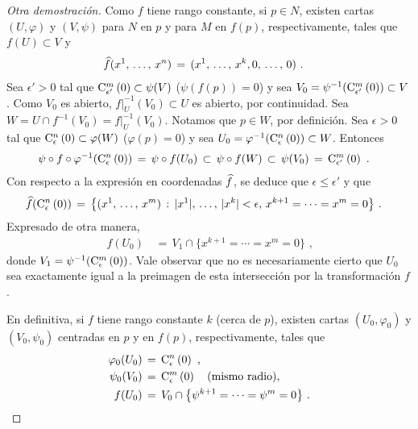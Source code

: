\begin{proof}[Otra demostraci\'{o}n]
	Como $f$ tiene rango constante, si $p\in N$, existen cartas
	$(U,\varphi)$ y $(V,\psi)$ para $N$ en $p$ y para $M$ en $f(p)$,
	respectivamente, tales que $f(U)\subset V$ y
	\begin{align*}
		\encoordenadas{f}(\lista*{x}{n}) & \,=\,
			(\lista*{x}{k},0,\,\dots,\,0)
		\text{ .}
	\end{align*}
	Sea $\epsilon'>0$ tal que $\cubo[m]{\epsilon'}{0}\subset\psi(V)$
	($\psi(f(p))=0$) y sea
	$V_0=\psi^{-1}(\cubo[m]{\epsilon'}{0})\subset V$. Como $V_0$ es
	abierto, $f|_U^{-1}(V_0)\subset U$ es abierto, por continuidad. Sea
	$W=U\cap f^{-1}(V_0)=f|_U^{-1}(V_0)$. Notamos que $p\in W$, por
	definici\'{o}n. Sea $\epsilon>0$ tal que
	$\cubo[n]{\epsilon}{0}\subset\varphi(W)$ ($\varphi(p)=0$) y sea
	$U_0=\varphi^{-1}(\cubo[n]{\epsilon}{0})\subset W$. Entonces
	\begin{align*}
		\psi\circ f\circ\varphi^{-1}(\cubo[n]{\epsilon}{0}) & \,=\,
			\psi\circ f(U_0) \,\subset\,\psi\circ f(W)\,\subset\,
			\psi(V_0)\,=\,\cubo[m]{\epsilon'}{0}
		\text{ .}
	\end{align*}
	Con respecto a la expresi\'{o}n en coordenadas $\encoordenadas{f}$, se
	deduce que $\epsilon\leq\epsilon'$ y que
	\begin{align*}
		\encoordenadas{f}(\cubo[n]{\epsilon}{0}) & \,=\,
			\big\{(\lista*{x}{m})\,:\,
				|x^1|,\,\dots,\,|x^k|<\epsilon,\,
				x^{k+1}=\cdots=x^m=0
				\big\}
		\text{ .}
	\end{align*}
	Expresado de otra manera,
	\begin{align*}
		f(U_0) & \,=\,V_1\cap \big\{x^{k+1}=\cdots=x^m=0\big\}
		\text{ ,}
	\end{align*}
	donde $V_1=\psi^{-1}(\cubo[m]{\epsilon}{0})$. Vale observar que no
	es necesariamente cierto que $U_0$ sea exactamente igual a la preimagen
	de esta intersecci\'{o}n por la transformaci\'{o}n $f$.

	En definitiva, si $f$ tiene rango constante $k$ (cerca de $p$), existen
	cartas $(U_0,\varphi_0)$ y $(V_0,\psi_0)$ centradas en $p$ y en $f(p)$,
	respectivamente, tales que
	\begin{align*}
		\varphi_0(U_0) & \,=\,\cubo[n]{\epsilon}{0} \text{ ,} \\
		\psi_0(V_0) & \,=\,\cubo[m]{\epsilon}{0}
			\quad\text{(mismo radio),} \\
		f(U_0) & \,=\,V_0\cap\big\{\psi^{k+1}=\cdots=\psi^m=0\big\}
		\text{ .}
	\end{align*}
\end{proof}
